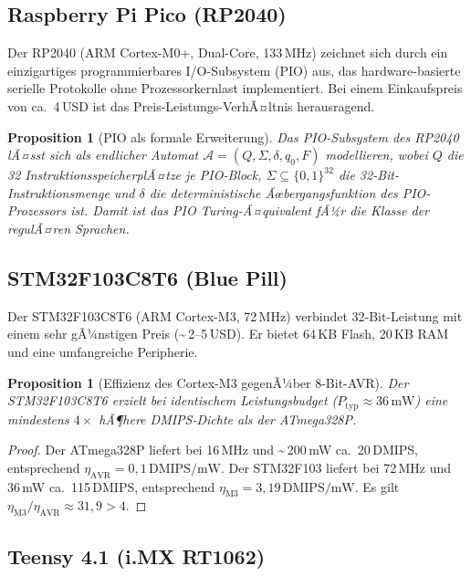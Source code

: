 ﻿\documentclass[12pt, a4paper]{article}
\theoremstyle{plain}
\newtheorem{proposition}[theorem]{Proposition}
\theoremstyle{definition}
\theoremstyle{remark}
\begin{document}
\subsection{Raspberry Pi Pico (RP2040)}

Der RP2040 (ARM Cortex-M0+, Dual-Core, 133\,MHz) zeichnet sich durch ein
einzigartiges programmierbares I/O-Subsystem (PIO) aus, das
hardware-basierte serielle Protokolle ohne Prozessorkernlast implementiert.
Bei einem Einkaufspreis von ca.\ 4\,USD ist das Preis-Leistungs-VerhÃ¤ltnis
herausragend.

\begin{proposition}[PIO als formale Erweiterung]
\label{prop:pio}
  Das PIO-Subsystem des RP2040 lÃ¤sst sich als endlicher Automat
  $\mathcal{A} = (Q, \Sigma, \delta, q_0, F)$ modellieren, wobei
  $Q$ die 32 InstruktionsspeicherplÃ¤tze je PIO-Block,
  $\Sigma \subseteq \{0,1\}^{32}$ die 32-Bit-Instruktionsmenge und
  $\delta$ die deterministische Ãœbergangsfunktion des PIO-Prozessors ist.
  Damit ist das PIO Turing-Ã¤quivalent fÃ¼r die Klasse der regulÃ¤ren Sprachen.
\end{proposition}

\subsection{STM32F103C8T6 (Blue Pill)}

Der STM32F103C8T6 (ARM Cortex-M3, 72\,MHz) verbindet 32-Bit-Leistung mit
einem sehr gÃ¼nstigen Preis (\textasciitilde\,2--5\,USD).
Er bietet 64\,KB Flash, 20\,KB RAM und eine umfangreiche Peripherie.

\begin{proposition}[Effizienz des Cortex-M3 gegenÃ¼ber 8-Bit-AVR]
\label{prop:cortex_m3}
  Der STM32F103C8T6 erzielt bei identischem Leistungsbudget
  ($P_\text{typ} \approx 36\,\text{mW}$) eine mindestens
  $4\times$ hÃ¶here DMIPS-Dichte als der ATmega328P.
\end{proposition}

\begin{proof}
  Der ATmega328P liefert bei 16\,MHz und \textasciitilde\,200\,mW ca.\ 20\,DMIPS,
  entsprechend $\eta_\text{AVR} = 0{,}1\,\text{DMIPS/mW}$.
  Der STM32F103 liefert bei 72\,MHz und 36\,mW ca.\ 115\,DMIPS,
  entsprechend $\eta_\text{M3} = 3{,}19\,\text{DMIPS/mW}$.
  Es gilt $\eta_\text{M3} / \eta_\text{AVR} \approx 31{,}9 > 4$.
 
\end{proof}

\subsection{Teensy 4.1 (i.MX RT1062)}
\end{document}
